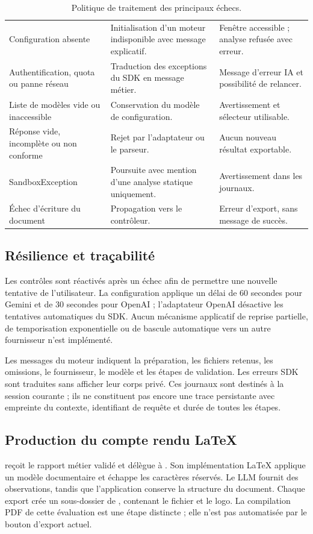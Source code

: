 \begin{table}[H]
\small
\begin{tabularx}{\textwidth}{@{}P{37mm}YP{45mm}@{}}
\toprule
{} &  & \\
\midrule
Configuration absente & Initialisation d'un moteur indisponible avec message explicatif. & Fenêtre accessible ; analyse refusée avec erreur.\\
Authentification, quota ou panne réseau & Traduction des exceptions du SDK en message métier. & Message d'erreur IA et possibilité de relancer.\\
Liste de modèles vide ou inaccessible & Conservation du modèle de configuration. & Avertissement et sélecteur utilisable.\\
Réponse vide, incomplète ou non conforme & Rejet par l'adaptateur ou le parseur. & Aucun nouveau résultat exportable.\\
SandboxException & Poursuite avec mention d'une analyse statique uniquement. & Avertissement dans les journaux.\\
Échec d'écriture du document & Propagation vers le contrôleur. & Erreur d'export, sans message de succès.\\
\bottomrule
\end{tabularx}
\caption{Politique de traitement des principaux échecs.}
\end{table}

\subsection{Résilience et traçabilité}
Les contrôles sont réactivés après un échec afin de permettre une nouvelle tentative de l'utilisateur. La configuration applique un délai de 60 secondes pour Gemini et de 30 secondes pour OpenAI ; l'adaptateur OpenAI désactive les tentatives automatiques du SDK. Aucun mécanisme applicatif de reprise partielle, de temporisation exponentielle ou de bascule automatique vers un autre fournisseur n'est implémenté.

Les messages du moteur indiquent la préparation, les fichiers retenus, les omissions, le fournisseur, le modèle et les étapes de validation. Les erreurs SDK sont traduites sans afficher leur corps privé. Ces journaux sont destinés à la session courante ; ils ne constituent pas encore une trace persistante avec empreinte du contexte, identifiant de requête et durée de toutes les étapes.

\subsection{Production du compte rendu LaTeX}
 reçoit le rapport métier validé et délègue à . Son implémentation LaTeX applique un modèle documentaire et échappe les caractères réservés. Le LLM fournit des observations, tandis que l'application conserve la structure du document. Chaque export crée un sous-dossier de , contenant le fichier  et le logo. La compilation PDF de cette évaluation est une étape distincte ; elle n'est pas automatisée par le bouton d'export actuel.

